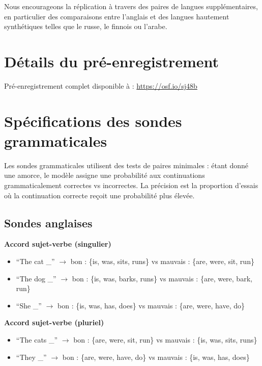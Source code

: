 \documentclass[11pt,a4paper]{article}
\begin{document}
Nous encourageons la réplication à travers des paires de langues supplémentaires, en particulier des comparaisons entre l'anglais et des langues hautement synthétiques telles que le russe, le finnois ou l'arabe.




\appendix

\section{Détails du pré-enregistrement}

Pré-enregistrement complet disponible à : \url{https://osf.io/sj48b}

\section{Spécifications des sondes grammaticales}

Les sondes grammaticales utilisent des tests de paires minimales : étant donné une amorce, le modèle assigne une probabilité aux continuations grammaticalement correctes vs incorrectes. La précision est la proportion d'essais où la continuation correcte reçoit une probabilité plus élevée.

\subsection{Sondes anglaises}

\textbf{Accord sujet-verbe (singulier)}
\begin{itemize}
    \item ``The cat \_'' $\rightarrow$ bon : \{is, was, sits, runs\} vs mauvais : \{are, were, sit, run\}
    \item ``The dog \_'' $\rightarrow$ bon : \{is, was, barks, runs\} vs mauvais : \{are, were, bark, run\}
    \item ``She \_'' $\rightarrow$ bon : \{is, was, has, does\} vs mauvais : \{are, were, have, do\}
\end{itemize}

\textbf{Accord sujet-verbe (pluriel)}
\begin{itemize}
    \item ``The cats \_'' $\rightarrow$ bon : \{are, were, sit, run\} vs mauvais : \{is, was, sits, runs\}
    \item ``They \_'' $\rightarrow$ bon : \{are, were, have, do\} vs mauvais : \{is, was, has, does\}
\end{itemize}
\end{document}
